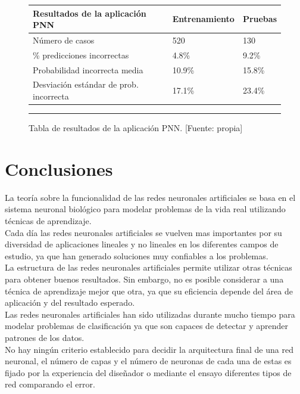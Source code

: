 \documentclass[11pt,titlepage]{report}
\begin{document}
\begin{figure}[h]
	\centering
		\begin{tabular}{| m{7cm} | m{3cm} | m{2cm} |}\hline
\textbf{Resultados de la aplicación PNN} & \textbf{Entrenamiento} & \textbf{Pruebas}\\ \hline
Número de casos	& 520 &	130 \\ \hline
\% predicciones incorrectas &	4.8\% &	9.2\%\\ \hline
Probabilidad incorrecta media &	10.9\% &	15.8\%\\ \hline
Desviación estándar de prob. incorrecta &	17.1\% &	23.4\% \\ \hline
	\end{tabular}
	\caption{Tabla de resultados de la aplicación PNN. [Fuente: propia]\label{22}}
	\hrule
\end{figure} 

\chapter{Conclusiones}
La teoría sobre la funcionalidad de las redes neuronales artificiales se basa en el sistema neuronal biológico para modelar problemas de la vida real utilizando técnicas de aprendizaje.\\

Cada día las redes neuronales artificiales se vuelven mas importantes por su diversidad de aplicaciones lineales y no lineales en los diferentes campos de estudio, ya que han generado soluciones muy confiables a los problemas.\\

La estructura de las redes neuronales artificiales permite utilizar otras técnicas para obtener buenos resultados. Sin embargo, no es posible considerar a una técnica de aprendizaje mejor que otra, ya que su eficiencia depende del área de aplicación y del resultado esperado.\\

Las redes neuronales artificiales han sido utilizadas durante mucho tiempo para modelar problemas de clasificación ya que son capaces de detectar y aprender patrones de los datos.\\  

No hay ningún criterio establecido para decidir la arquitectura final de una red neuronal, el número de capas y el número de neuronas de cada una de estas es fijado por la experiencia del diseñador o mediante el ensayo diferentes tipos de red comparando el error.\\
\end{document}
